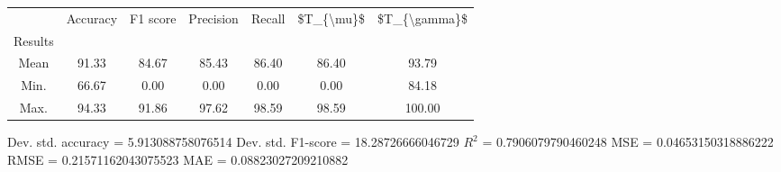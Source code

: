 \begin{tabular}{|c|c|c|c|c|c|c|}
\toprule
{} &  Accuracy &  F1 score &  Precision &  Recall &  \$T\_\{\textbackslash mu\}\$ &  \$T\_\{\textbackslash gamma\}\$ \\
Results &           &           &            &         &            &               \\
\hline
Mean    &     91.33 &     84.67 &      85.43 &   86.40 &      86.40 &         93.79 \\
Min.    &     66.67 &      0.00 &       0.00 &    0.00 &       0.00 &         84.18 \\
Max.    &     94.33 &     91.86 &      97.62 &   98.59 &      98.59 &        100.00 \\
\bottomrule
\end{tabular}

 Dev. std. accuracy = 5.913088758076514
 Dev. std. F1-score = 18.28726666046729
 $R^2$ = 0.7906079790460248
 MSE = 0.04653150318886222
 RMSE = 0.21571162043075523
 MAE = 0.08823027209210882